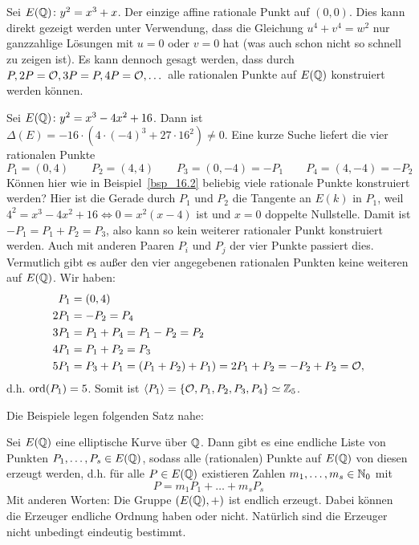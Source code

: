 \begin{bsp}
\label{bsp_16.3}
	Sei $E(\QQ)\colon y^2 = x^3+x$.
	Der einzige affine rationale Punkt auf $(0,0)$.
	Dies kann direkt gezeigt werden unter Verwendung, dass die Gleichung $u^4+v^4 = w^2$ nur ganzzahlige Lösungen mit $u=0$ oder $v=0$ hat (was auch schon nicht so schnell zu zeigen ist).
	Es kann dennoch gesagt werden, dass durch $P, 2P = \oh, 3P = P, 4P = \oh, \dots$ alle rationalen Punkte auf $E(\QQ)$ konstruiert werden können.
\end{bsp}

\begin{bsp}
\label{bsp_16.4}
	Sei $E(\QQ)\colon y^2 = x^3 - 4x^2 + 16$.
	Dann ist $\Delta(E) = -16 \cdot (4 \cdot (-4)^3 + 27 \cdot 16^2) \neq 0$.
	Eine kurze Suche liefert die vier rationalen Punkte
	\[
		P_1 = (0,4) \qquad P_2 = (4,4) \qquad P_3 = (0,-4) = -P_1 \qquad P_4 = (4,-4) = -P_2
	\]
	Können hier wie in Beispiel~\ref{bsp_16.2} beliebig viele rationale Punkte konstruiert werden?
	Hier ist die Gerade durch $P_1$ und $P_2$ die Tangente an $E(k)$ in $P_1$, weil $4^2 = x^3 - 4x^2 + 16 \Leftrightarrow 0 = x^2(x-4)$ ist und $x = 0$ doppelte Nullstelle.
	Damit ist $-P_1 = P_1 + P_2 = P_3$, also kann so kein weiterer rationaler Punkt konstruiert werden.
	Auch mit anderen Paaren $P_i$ und $P_j$ der vier Punkte passiert dies.
	Vermutlich gibt es außer den vier angegebenen rationalen Punkten keine weiteren auf $E(\QQ)$.
	Wir haben:
	\begin{equation}
	\begin{aligned}
		P_1 &= (0,4) \\
		2P_1 &= -P_2 = P_4 \\
		3P_1 &= P_1 + P_4 = P_1 - P_2 = P_2 \\
		4P_1 &= P_1 + P_2 = P_3 \\
		5P_1 &= P_3 + P_1 = (P_1 + P_2) + P_1) = 2P_1 + P_2 = -P_2 + P_2 = \oh,
	\end{aligned}
	\end{equation} 
	d.h. $\ord(P_1) = 5$.
	Somit ist $\sprod*{P_1} = \{\oh, P_1, P_2, P_3, P_4\} \simeq \ZZ_5$.
\end{bsp}

Die Beispiele legen folgenden Satz nahe:
\begin{satz}
\label{satz_mordell} \label{satz_16.5}
	Sei $E(\QQ)$ eine elliptische Kurve über $\QQ$.
	Dann gibt es eine endliche Liste von Punkten $P_1,\dots,P_s \in E(\QQ)$, sodass alle (rationalen) Punkte auf $E(\QQ)$ von diesen erzeugt werden, d.h. für alle $P \in E(\QQ)$ existieren Zahlen $m_1,\dots,m_s \in \NN_0$ mit
	\[
		P = m_1 P_1 + \dots + m_s P_s
	\]
	Mit anderen Worten: Die Gruppe $(E(\QQ),+)$ ist endlich erzeugt.
	Dabei können die Erzeuger endliche Ordnung haben oder nicht.
	Natürlich sind die Erzeuger nicht unbedingt eindeutig bestimmt.
\end{satz}

